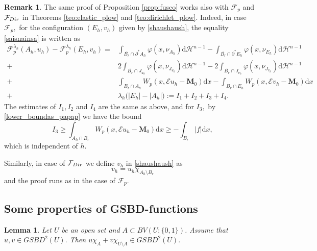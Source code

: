 \documentclass[reqno]{amsart}
\numberwithin{equation}{section}
\theoremstyle{plain}
\newtheorem{lemma}[theorem]{Lemma}
\theoremstyle{definition}
\newtheorem{remark}[theorem]{Remark}
\newcommand{\bM}{\mathbf{M}}
\newcommand{\cH}{\mathcal{H}}
\newcommand{\cF}{\mathcal{F}}
\newcommand{\p}{\partial}
\newcommand{\cl}[1]{\overline{#1}}
\renewcommand{\d}{\mathrm{d}}
\newcommand{\str}[1]{\mathcal{E}#1}
\begin{document}
\begin{remark}\label{rem:extension_fuscortr}
The same proof of Proposition \ref{prop:fusco} works also with $\cF_p$ and $\cF_{\rm Dir}$ in Theorems \ref{teo:elastic_plow} and \ref{teo:dirichlet_plow}. Indeed, in case $\cF_p,$ for the configuration $(E_h,v_h)$ given by \eqref{shaushaush}, the  equality \eqref{saisnainsa} is written as
\begin{align*}
\cF_p^{\lambda_h}(A_h,u_h) - \cF_p^{\lambda_h}(E_h,v_h)
= & \int_{\cl{B_r}\cap \p^*A_h} \varphi(x,\nu_{A_h})\d\cH^{n-1} - 
\int_{\cl{B_r}\cap \p^*E_h} \varphi(x,\nu_{E_h})\d\cH^{n-1} \\
+ & 2\int_{\overline{B_r}\cap J_{u_h}} \varphi(x,\nu_{J_{u_h}})\d\cH^{n-1}
- 2\int_{\overline{B_r}\cap J_{v_h}} \varphi(x,\nu_{J_{v_h}})\d\cH^{n-1} \\
+ &  \int_{B_r\cap A_h} W_p(x,\str{u_h} - \bM_0)\d x - \int_{B_r\cap E_h} W_p(x,\str{v_h} - \bM_0)\d x \\
+ & \lambda_h \Big(|E_h| - |A_h|\Big)
:= I_1 + I_2 + I_3+I_4.  
\end{align*}
The estimates of $I_1,I_2$ and $I_4$ are the same as above, and for $I_3,$ by \eqref{lower_boundas_papap} we have the bound
$$
I_3 \ge \int_{A_h\cap B_r} W_p(x,\str{u_h} - \bM_0)\d x 
\ge -\int_{B_r}|f|\d x,
$$
which is independent of $h.$

Similarly, in case of $\cF_{\rm Dir}$ we define $v_h$ in \eqref{shaushaush} as 
$$
v_h = u_h\chi_{A_h\setminus B_r}
$$
and the proof runs as in the case of $\cF_p.$
\end{remark}


\subsection{Some properties of GSBD-functions}

\begin{lemma}\label{lem:changing_GSBD_functions}
Let $U$ be an open set and $A\subset BV(U;\{0,1\})$. Assume that $u,v\in GSBD^2(U).$ Then $u\chi_A + v\chi_{U\setminus A}\in GSBD^2(U).$  
\end{lemma}
\end{document}
